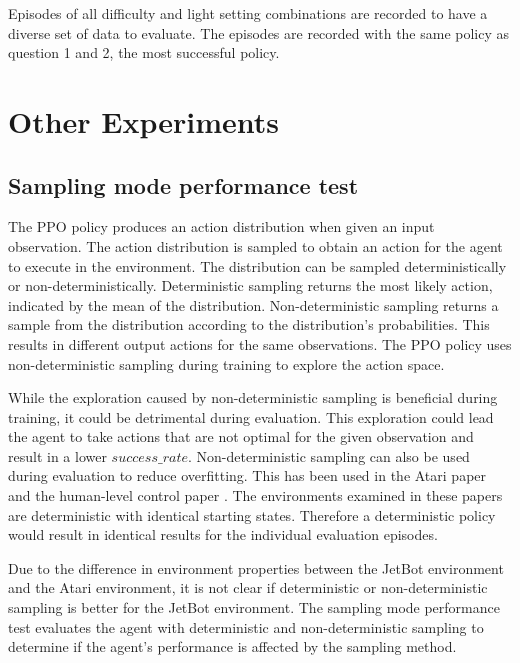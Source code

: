 Episodes of all difficulty and light setting combinations are recorded to have a diverse set of data to evaluate. The episodes are recorded with the same policy as question 1 and 2, the most successful policy.



\section{Other Experiments}

\subsection{Sampling mode performance test}
\label{sec:deterministic_check}

The PPO policy produces an action distribution when given an input observation. The action distribution is sampled to obtain an action for the agent to execute in the environment. The distribution can be sampled deterministically or non-deterministically. Deterministic sampling returns the most likely action, indicated by the mean of the distribution. Non-deterministic sampling returns a sample from the distribution according to the distribution's probabilities. This results in different output actions for the same observations. The PPO policy uses non-deterministic sampling during training to explore the action space.

While the exploration caused by non-deterministic sampling is beneficial during training, it could be detrimental during evaluation. This exploration could lead the agent to take actions that are not optimal for the given observation and result in a lower $success\_rate$. Non-deterministic sampling can also be used during evaluation to reduce overfitting. This has been used in the Atari paper \textcite{atari} and the human-level control paper \textcite{human_level_control}. The environments examined in these papers are deterministic with identical starting states. Therefore a deterministic policy would result in identical results for the individual evaluation episodes.

Due to the difference in environment properties between the JetBot environment and the Atari environment, it is not clear if deterministic or non-deterministic sampling is better for the JetBot environment. The sampling mode performance test evaluates the agent with deterministic and non-deterministic sampling to determine if the agent's performance is affected by the sampling method.

